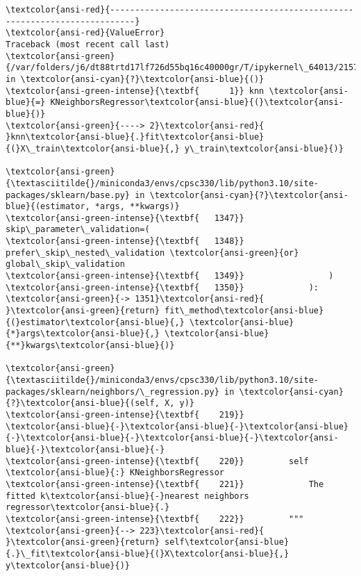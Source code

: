 \documentclass[11pt]{article}
\begin{document}
    \begin{Verbatim}[commandchars=\\\{\}, frame=single, framerule=2mm, rulecolor=\color{outerrorbackground}]
\textcolor{ansi-red}{---------------------------------------------------------------------------}
\textcolor{ansi-red}{ValueError}                                Traceback (most recent call last)
\textcolor{ansi-green}{/var/folders/j6/dt88trtd17lf726d55bq16c40000gr/T/ipykernel\_64013/2157252593.py} in \textcolor{ansi-cyan}{?}\textcolor{ansi-blue}{()}
\textcolor{ansi-green-intense}{\textbf{      1}} knn \textcolor{ansi-blue}{=} KNeighborsRegressor\textcolor{ansi-blue}{(}\textcolor{ansi-blue}{)}
\textcolor{ansi-green}{----> 2}\textcolor{ansi-red}{ }knn\textcolor{ansi-blue}{.}fit\textcolor{ansi-blue}{(}X\_train\textcolor{ansi-blue}{,} y\_train\textcolor{ansi-blue}{)}

\textcolor{ansi-green}{\textasciitilde{}/miniconda3/envs/cpsc330/lib/python3.10/site-packages/sklearn/base.py} in \textcolor{ansi-cyan}{?}\textcolor{ansi-blue}{(estimator, *args, **kwargs)}
\textcolor{ansi-green-intense}{\textbf{   1347}}                 skip\_parameter\_validation=(
\textcolor{ansi-green-intense}{\textbf{   1348}}                     prefer\_skip\_nested\_validation \textcolor{ansi-green}{or} global\_skip\_validation
\textcolor{ansi-green-intense}{\textbf{   1349}}                 )
\textcolor{ansi-green-intense}{\textbf{   1350}}             ):
\textcolor{ansi-green}{-> 1351}\textcolor{ansi-red}{                 }\textcolor{ansi-green}{return} fit\_method\textcolor{ansi-blue}{(}estimator\textcolor{ansi-blue}{,} \textcolor{ansi-blue}{*}args\textcolor{ansi-blue}{,} \textcolor{ansi-blue}{**}kwargs\textcolor{ansi-blue}{)}

\textcolor{ansi-green}{\textasciitilde{}/miniconda3/envs/cpsc330/lib/python3.10/site-packages/sklearn/neighbors/\_regression.py} in \textcolor{ansi-cyan}{?}\textcolor{ansi-blue}{(self, X, y)}
\textcolor{ansi-green-intense}{\textbf{    219}}         \textcolor{ansi-blue}{-}\textcolor{ansi-blue}{-}\textcolor{ansi-blue}{-}\textcolor{ansi-blue}{-}\textcolor{ansi-blue}{-}\textcolor{ansi-blue}{-}\textcolor{ansi-blue}{-}
\textcolor{ansi-green-intense}{\textbf{    220}}         self \textcolor{ansi-blue}{:} KNeighborsRegressor
\textcolor{ansi-green-intense}{\textbf{    221}}             The fitted k\textcolor{ansi-blue}{-}nearest neighbors regressor\textcolor{ansi-blue}{.}
\textcolor{ansi-green-intense}{\textbf{    222}}         """
\textcolor{ansi-green}{--> 223}\textcolor{ansi-red}{         }\textcolor{ansi-green}{return} self\textcolor{ansi-blue}{.}\_fit\textcolor{ansi-blue}{(}X\textcolor{ansi-blue}{,} y\textcolor{ansi-blue}{)}


\end{Verbatim}
\end{document}
